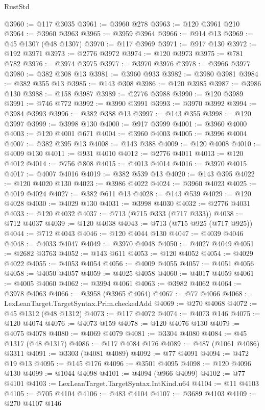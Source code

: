\begin{lexlean}{RustStd}
\begin{coremodule}
@3960 := @117 @3035
@3961 := @3960 @278
@3963 := @120 @3961 @210
@3964 := @3960 @3963
@3965 := @3959 @3964
@3966 := @914 @13
@3969 := @45 @1307 (@48 @1307)
@3970 := @117 @3969
@3971 := @917 @130
@3972 := @192 @3971
@3973 := @2776 @3972
@3974 := @120 @3973
@3975 := @781 @782
@3976 := @3974 @3975
@3977 := @3970 @3976
@3978 := @3966 @3977
@3980 := @382 @308 @13
@3981 := @3960 @933
@3982 := @3980 @3981
@3984 := @382 @355 @13
@3985 := @143 @308
@3986 := @120 @3985
@3987 := @3986 @130
@3988 := @158 @3987
@3989 := @2776 @3988
@3990 := @120 @3989
@3991 := @746 @772
@3992 := @3990 @3991
@3993 := @3970 @3992
@3994 := @3984 @3993
@3996 := @382 @388 @13
@3997 := @143 @355
@3998 := @120 @3997
@3999 := @3998 @130
@4000 := @917 @3999
@4001 := @3960 @4000
@4003 := @120 @4001 @671
@4004 := @3960 @4003
@4005 := @3996 @4004
@4007 := @382 @395 @13
@4008 := @143 @388
@4009 := @120 @4008
@4010 := @4009 @130
@4011 := @931 @4010
@4012 := @2776 @4011
@4013 := @120 @4012
@4014 := @756 @808
@4015 := @4013 @4014
@4016 := @3970 @4015
@4017 := @4007 @4016
@4019 := @382 @539 @13
@4020 := @143 @395
@4022 := @120 @4020 @130
@4023 := @3986 @4022
@4024 := @3960 @4023
@4025 := @4019 @4024
@4027 := @382 @611 @13
@4028 := @143 @539
@4029 := @120 @4028
@4030 := @4029 @130
@4031 := @3998 @4030
@4032 := @2776 @4031
@4033 := @120 @4032
@4037 := @713 (@715 @333 (@717 @333))
@4038 := @712 @4037
@4039 := @120 @4038
@4043 := @713 (@715 @925 (@717 @925))
@4044 := @712 @4043
@4046 := @120 @4044 @130
@4047 := @4039 @4046
@4048 := @4033 @4047
@4049 := @3970 @4048
@4050 := @4027 @4049
@4051 := @2682 @3763
@4052 := @143 @611
@4053 := @120 @4052
@4054 := @4029 @4022
@4055 := @4053 @4054
@4056 := @4009 @4055
@4057 := @4051 @4056
@4058 := @4050 @4057
@4059 := @4025 @4058
@4060 := @4017 @4059
@4061 := @4005 @4060
@4062 := @3994 @4061
@4063 := @3982 @4062
@4064 := @3978 @4063
@4066 := @3958 (@3965 @4064)
@4067 := @77 @4066
@4068 := LexLeanTarget.TargetSyntax.Prim.checkedAdd
@4069 := @270 @4068
@4072 := @45 @1312 (@48 @1312)
@4073 := @117 @4072
@4074 := @4073 @146
@4075 := @120 @4074
@4076 := @4073 @159
@4078 := @120 @4076 @130
@4079 := @4075 @4078
@4080 := @4069 @4079
@4081 := @3304 @4080
@4084 := @45 @1317 (@48 @1317)
@4086 := @117 @4084 @176
@4089 := @487 (@1061 @4086) @3311
@4091 := @3303 (@4081 @4089)
@4092 := @77 @4091
@4094 := @472 @19 @13
@4095 := @145 @176
@4096 := @3501 @4095
@4098 := @120 @4096 @130
@4099 := @1044 @4098
@4101 := @4094 (@966 @4099)
@4102 := @77 @4101
@4103 := LexLeanTarget.TargetSyntax.IntKind.u64
@4104 := @11 @4103
@4105 := @705 @4104
@4106 := @483 @4104
@4107 := @3689 @4103
@4109 := @270 @4107 @146

\end{coremodule}
\end{lexlean}
